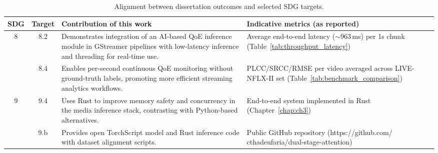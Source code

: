 \begin{table}[h]
\centering
\caption{Alignment between dissertation outcomes and selected SDG targets.}
\label{tab:sdg_matrix}
\begin{tabular}{@{}|c|c|p{56mm}|p{47mm}|@{}}
\toprule
\textbf{SDG} & \textbf{Target} & \textbf{Contribution of this work} & \textbf{Indicative metrics (as reported)} \\ \midrule\midrule
\multirow{2}{*}{8}
 & 8.2 & Demonstrates integration of an AI-based QoE inference module in GStreamer pipelines with low-latency inference and threading for real-time use. & Average end-to-end latency ($\sim$963\,ms) per 1s chunk (Table~\ref{tab:throughput_latency}) \\ \cline{2-4}
 & 8.4 & Enables per-second continuous QoE monitoring without ground-truth labels, promoting more efficient streaming analytics workflows. & PLCC/SRCC/RMSE per video averaged across LIVE-NFLX-II set (Table~\ref{tab:benchmark_comparison}) \\ \midrule
\multirow{2}{*}{9}
 & 9.4 & Uses Rust to improve memory safety and concurrency in the media inference stack, contrasting with Python-based alternatives. & End-to-end system implemented in Rust (Chapter~\ref{chap:ch3}) \\ \cline{2-4}
 & 9.b & Provides open TorchScript model and Rust inference code with dataset alignment scripts. & Public GitHub repository (https://github.com/ cthadeufaria/dual-stage-attention) \\ \bottomrule
\end{tabular}
\end{table}